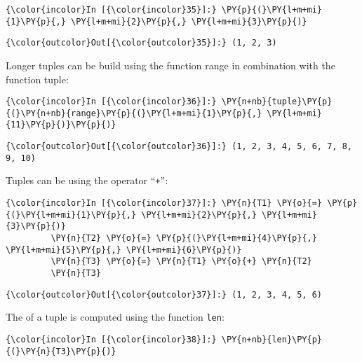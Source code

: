 \begin{Verbatim}[commandchars=\\\{\}]
{\color{incolor}In [{\color{incolor}35}]:} \PY{p}{(}\PY{l+m+mi}{1}\PY{p}{,} \PY{l+m+mi}{2}\PY{p}{,} \PY{l+m+mi}{3}\PY{p}{)}
\end{Verbatim}

\begin{Verbatim}[commandchars=\\\{\}]
{\color{outcolor}Out[{\color{outcolor}35}]:} (1, 2, 3)
\end{Verbatim}
Longer tuples can be build using the function range in combination with the function tuple:

\begin{Verbatim}[commandchars=\\\{\}]
{\color{incolor}In [{\color{incolor}36}]:} \PY{n+nb}{tuple}\PY{p}{(}\PY{n+nb}{range}\PY{p}{(}\PY{l+m+mi}{1}\PY{p}{,} \PY{l+m+mi}{11}\PY{p}{)}\PY{p}{)}
\end{Verbatim}


\begin{Verbatim}[commandchars=\\\{\}]
{\color{outcolor}Out[{\color{outcolor}36}]:} (1, 2, 3, 4, 5, 6, 7, 8, 9, 10)
\end{Verbatim}
Tuples can be  using the operator ``\texttt{+}'':

\begin{Verbatim}[commandchars=\\\{\}]
{\color{incolor}In [{\color{incolor}37}]:} \PY{n}{T1} \PY{o}{=} \PY{p}{(}\PY{l+m+mi}{1}\PY{p}{,} \PY{l+m+mi}{2}\PY{p}{,} \PY{l+m+mi}{3}\PY{p}{)}
         \PY{n}{T2} \PY{o}{=} \PY{p}{(}\PY{l+m+mi}{4}\PY{p}{,} \PY{l+m+mi}{5}\PY{p}{,} \PY{l+m+mi}{6}\PY{p}{)}
         \PY{n}{T3} \PY{o}{=} \PY{n}{T1} \PY{o}{+} \PY{n}{T2}
         \PY{n}{T3}
\end{Verbatim}


\begin{Verbatim}[commandchars=\\\{\}]
{\color{outcolor}Out[{\color{outcolor}37}]:} (1, 2, 3, 4, 5, 6)
\end{Verbatim}
The  of a tuple is computed using the function \texttt{len}:

\begin{Verbatim}[commandchars=\\\{\}]
{\color{incolor}In [{\color{incolor}38}]:} \PY{n+nb}{len}\PY{p}{(}\PY{n}{T3}\PY{p}{)}
\end{Verbatim}


